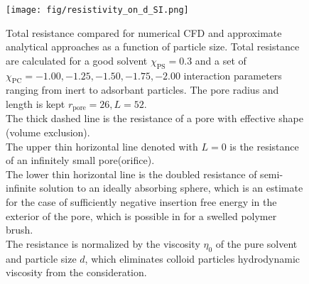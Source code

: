 \documentclass[10pt, a4paper]{article}
\begin{document}
\begin{multicols}{2}
\begin{figure}[H]
    \centering
    \texttt{[image: fig/resistivity\_on\_d\_SI.png]}
    \caption{
        Total resistance compared for numerical CFD and approximate analytical approaches as a function of particle size.
        Total resistance are calculated for a good solvent $\chi_{\textrm{PS}} = 0.3$ and a set of $\chi_{\textrm{PC}} = {-1.00, -1.25, -1.50, -1.75, -2.00}$ interaction parameters ranging from inert to adsorbant particles.
        The pore radius and length is kept $r_{\textrm{pore}} = 26, L = 52$.
        \\
        The thick dashed line is the resistance of a pore with effective shape (volume exclusion).
        \\
        The upper thin horizontal line denoted with $L=0$ is the resistance of an infinitely small pore(orifice).
        \\
        The lower thin horizontal line is the doubled resistance of semi-infinite solution to an ideally absorbing sphere, which is an estimate for the case of sufficiently negative insertion free energy in the exterior of the pore, which is possible in for a swelled polymer brush.
        \\
        The resistance is normalized by the viscosity $\eta_{0}$ of the pure solvent and particle size $d$, which  eliminates colloid particles hydrodynamic viscosity from the consideration.
        }
    \label{fig:CFD_comparison}
\end{figure}
    
\end{multicols}



\end{document}
